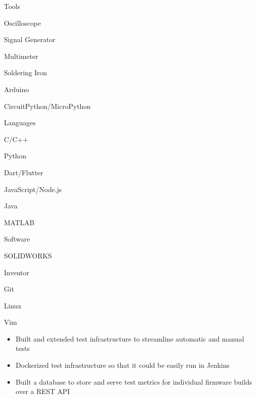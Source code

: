 \documentclass{resume}
\author{Jasper Chan}
\begin{document}
\maketitle

\vspace{-1em} %
\TechnicalSkills

\begin{TechSkills}{Tools}
    \item Oscilloscope
    \item Signal Generator
    \item Multimeter
    \item Soldering Iron
    \item Arduino
    \item CircuitPython/MicroPython
\end{TechSkills}
\begin{TechSkills}{Languages}
    \item C/C++
    \item Python
    \item Dart/Flutter
    \item JavaScript/Node.js
    \item Java
    \item MATLAB
\end{TechSkills}
\begin{TechSkills}{Software}
    \item SOLIDWORKS
    \item Inventor
    \item Git
    \item Linux
    \item Vim
\end{TechSkills}

\CoopStatus


\CoopWorkExperience

\begin{itemize}
    \item Built and extended test infrastructure to streamline automatic and manual tests
    \item Dockerized test infrastructure so that it could be easily run in Jenkins
    \item Built a database to store and serve test metrics for individual firmware builds over a REST API
\end{itemize}
\end{document}
